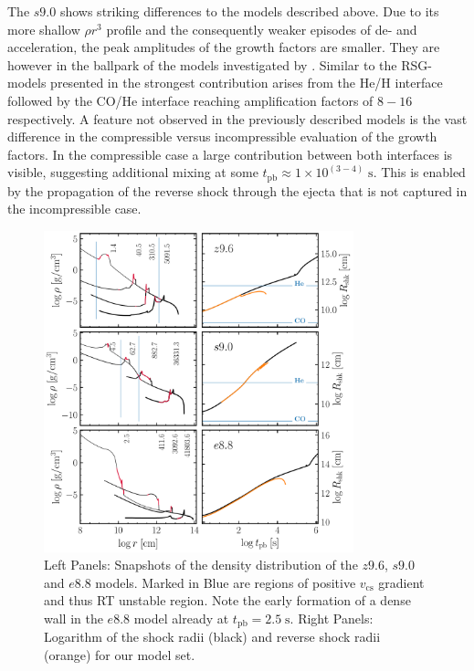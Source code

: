 \documentclass[fleqn,usenatbib]{mnras}
\begin{document}
The $s9.0$ shows striking differences to the models described above. 
Due to its more shallow $\rho r^3$ profile and the consequently weaker episodes of de- and acceleration, the peak amplitudes of the growth factors are smaller. They are however in the ballpark of the models investigated by \citet{Wongwathanarat2015}. 
Similar to the RSG-models presented in \citet{Wongwathanarat2015} the strongest contribution arises from the He/H interface followed by the CO/He interface reaching amplification factors of $8-16$ respectively. 
A feature not observed in the previously described models is the vast difference in the compressible versus incompressible evaluation of the growth factors. In the compressible case a large contribution between both interfaces is visible, suggesting additional mixing at some $t_{\mathrm{pb}}\approx 1\times 10^{(3-4)}\;\mathrm{s}$. This is enabled by the propagation of the reverse shock through the ejecta that is not captured in the incompressible case. 

\begin{figure}
 \centering
 \includegraphics[width=0.8\textwidth]{pic/density_times_all.pdf}
 \caption{Left Panels: Snapshots of the density distribution of the $z9.6$, $s9.0$ and $e8.8$ models. Marked in Blue are regions of positive $v_{\mathrm{cs}}$ gradient and thus RT unstable region. Note the early formation of a dense wall in the $e8.8$ model already at $t_{\mathrm{pb}}=2.5\;\mathrm{s}$. Right Panels: Logarithm of the shock radii (black) and reverse shock radii (orange) for our model set. }
 \label{fig:density all times}
\end{figure}
\end{document}
